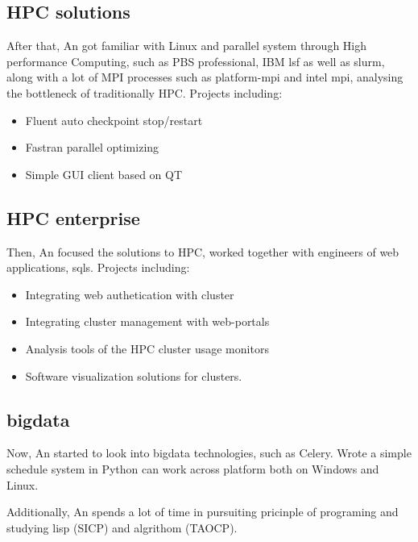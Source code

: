 \documentclass[letterpaper]{twentysecondcv} %
\begin{document}
\subsection{{\small HPC solutions}}
After that, An got familiar with Linux and parallel system through High performance Computing, such as PBS professional, IBM lsf as well as slurm, along with a lot of MPI processes such as platform-mpi and intel mpi, analysing the bottleneck of traditionally HPC. 
Projects including:

  \begin{itemize}
  \item Fluent auto checkpoint  stop/restart
  \item Fastran parallel optimizing
  \item Simple GUI client based on QT
  \end{itemize}

\subsection{{\small HPC enterprise}}
Then, An focused the solutions to HPC, worked together with engineers of web applications, sqls. 
Projects including:
{\small
  \begin{itemize}
  \item Integrating web authetication with cluster 
  \item Integrating cluster management with web-portals
  \item Analysis tools of the HPC cluster usage monitors
  \item Software visualization solutions for clusters.
  \end{itemize}
}

\subsection{{\small bigdata}}

Now, An started to look into bigdata technologies, such as Celery.
Wrote a simple schedule system in Python can work across platform both on Windows and Linux. 

Additionally, An spends a lot of time in pursuiting pricinple of programing and studying lisp (SICP) and algrithom (TAOCP).
\end{document}
